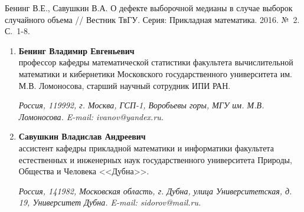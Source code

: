 \documentclass[a4paper,twoside]{article}
\theoremstyle{theorem}
\theoremstyle{remark}
\newcommand{\pages}{1-8}
\begin{document}
\bigskip\bigskip{}





\bigskip{}\medskip
{Бенинг В.Е., Савушкин В.А. О дефекте выборочной медианы в случае выборок случайного объема // Вестник ТвГУ. Серия: Прикладная математика. 2016. №~2. С.~\pages.}

\bigskip{}
\begin{enumerate}[1.]
\item {\bf Бенинг Владимир Евгеньевич}\\
профессор кафедры математической статистики факультета вычислительной математики и кибернетики Московского 
государственного университета им. М.В. Ломоносова, старший научный сотрудник ИПИ РАН.

\vspace{1mm}
{\it Россия, 119992, г. Москва, ГСП-1, Воробьевы горы, МГУ им. М.В. Ломоносова. E-mail: ivanov@yandex.ru.} 
\item {\bf Савушкин Владислав Андреевич}\\
ассистент кафедры прикладной математики и информатики факультета естественных  и инженерных наук государственного университета Природы, Общества и Человека <<Дубна>>.

\vspace{1mm}
{\it Россия, 141982, Московская область, г. Дубна, улица Университетская, д. 19, Университет Дубна. E-mail: sidorov@mail.ru.} 
\end{enumerate} 
\end{document}
